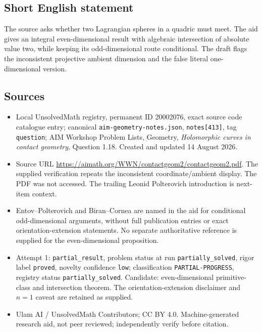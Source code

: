 \documentclass[11pt]{article}
\begin{document}
\subsection{Short English statement}
The source asks whether two Lagrangian spheres in a quadric must meet. The aid gives an integral even-dimensional result with algebraic intersection of absolute value two, while keeping its odd-dimensional route conditional. The draft flags the inconsistent projective ambient dimension and the false literal one-dimensional version.
\subsection{Sources}
\begin{itemize}
\item Local UnsolvedMath registry, permanent ID 20002076, exact source code catalogue entry; canonical \texttt{aim-geometry-notes.json}, \texttt{notes[413]}, tag \texttt{question}; AIM Workshop Problem Lists, Geometry, \emph{Holomorphic curves in contact geometry}, Question 1.18. Created and updated 14 August 2026.
\item Source URL \url{https://aimath.org/WWN/contactgeom2/contactgeom2.pdf}. The supplied verification repeats the inconsistent coordinate/ambient display. The PDF was not accessed. The trailing Leonid Polterovich introduction is next-item context.
\item Entov--Polterovich and Biran--Cornea are named in the aid for conditional odd-dimensional arguments, without full publication entries or exact orientation-extension statements. No separate authoritative reference is supplied for the even-dimensional proposition.
\item Attempt 1: \texttt{partial\_result}, problem status at run \texttt{partially\_solved}, rigor label \texttt{proved}, novelty confidence \texttt{low}; classification \texttt{PARTIAL-PROGRESS}, registry status \texttt{partially\_solved}. Candidate: even-dimensional primitive-class and intersection theorem. The orientation-extension disclaimer and \(n=1\) caveat are retained as supplied.
\item Ulam AI / UnsolvedMath Contributors; CC BY 4.0. Machine-generated research aid, not peer reviewed; independently verify before citation.
\end{itemize}
\end{document}

